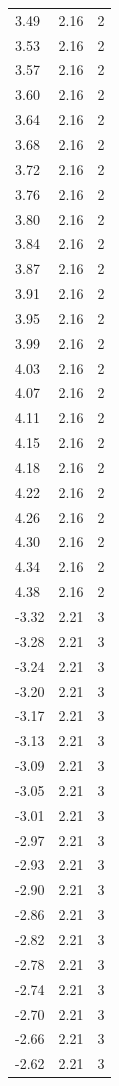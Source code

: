 \begin{longtable}{lrr}
  3.49 & 2.16 & 2 \\
  3.53 & 2.16 & 2 \\
  3.57 & 2.16 & 2 \\
  3.60 & 2.16 & 2 \\
  3.64 & 2.16 & 2 \\
  3.68 & 2.16 & 2 \\
  3.72 & 2.16 & 2 \\
  3.76 & 2.16 & 2 \\
  3.80 & 2.16 & 2 \\
  3.84 & 2.16 & 2 \\
  3.87 & 2.16 & 2 \\
  3.91 & 2.16 & 2 \\
  3.95 & 2.16 & 2 \\
  3.99 & 2.16 & 2 \\
  4.03 & 2.16 & 2 \\
  4.07 & 2.16 & 2 \\
  4.11 & 2.16 & 2 \\
  4.15 & 2.16 & 2 \\
  4.18 & 2.16 & 2 \\
  4.22 & 2.16 & 2 \\
  4.26 & 2.16 & 2 \\
  4.30 & 2.16 & 2 \\
  4.34 & 2.16 & 2 \\
  4.38 & 2.16 & 2 \\
  -3.32 & 2.21 & 3 \\
  -3.28 & 2.21 & 3 \\
  -3.24 & 2.21 & 3 \\
  -3.20 & 2.21 & 3 \\
  -3.17 & 2.21 & 3 \\
  -3.13 & 2.21 & 3 \\
  -3.09 & 2.21 & 3 \\
  -3.05 & 2.21 & 3 \\
  -3.01 & 2.21 & 3 \\
  -2.97 & 2.21 & 3 \\
  -2.93 & 2.21 & 3 \\
  -2.90 & 2.21 & 3 \\
  -2.86 & 2.21 & 3 \\
  -2.82 & 2.21 & 3 \\
  -2.78 & 2.21 & 3 \\
  -2.74 & 2.21 & 3 \\
  -2.70 & 2.21 & 3 \\
  -2.66 & 2.21 & 3 \\
  -2.62 & 2.21 & 3 \\

\end{longtable}
